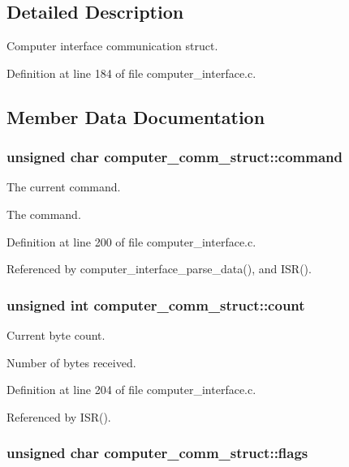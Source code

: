\subsection{Detailed Description}
Computer interface communication struct. 

Definition at line 184 of file computer\_\-interface.c.

\subsection{Member Data Documentation}
\hypertarget{structcomputer__comm__struct_7a513d0a4376dc48e1b912bdb22bd97d}{
\subsubsection[{command}]{\setlength{\rightskip}{0pt plus 5cm}unsigned char {\bf computer\_\-comm\_\-struct::command}}}
\label{structcomputer__comm__struct_7a513d0a4376dc48e1b912bdb22bd97d}


The current command. 

The command. 

Definition at line 200 of file computer\_\-interface.c.

Referenced by computer\_\-interface\_\-parse\_\-data(), and ISR().\hypertarget{structcomputer__comm__struct_d652a5eb42fc02f02392840741f09825}{
\subsubsection[{count}]{\setlength{\rightskip}{0pt plus 5cm}unsigned int {\bf computer\_\-comm\_\-struct::count}}}
\label{structcomputer__comm__struct_d652a5eb42fc02f02392840741f09825}


Current byte count. 

Number of bytes received. 

Definition at line 204 of file computer\_\-interface.c.

Referenced by ISR().\hypertarget{structcomputer__comm__struct_ab774dfbd7ea8cbd5803d7f53dfc916a}{
\subsubsection[{flags}]{\setlength{\rightskip}{0pt plus 5cm}unsigned char {\bf computer\_\-comm\_\-struct::flags}}}
\label{structcomputer__comm__struct_ab774dfbd7ea8cbd5803d7f53dfc916a}


